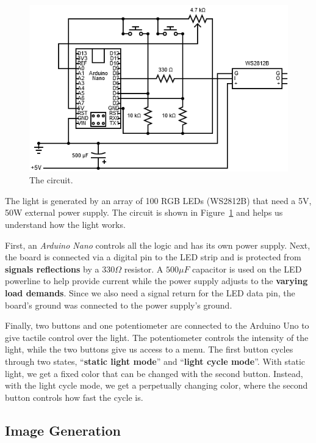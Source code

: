 \documentclass[preprint]{elsarticle}
\begin{document}
\begin{figure}[H]
	\centering
	\includegraphics[scale=0.5, keepaspectratio]{img/project_img/circuit-light.png}
	\caption{The circuit.}
	\label{fig:light-circuit}
\end{figure}

The light is generated by an array of 100 RGB LEDs (WS2812B) that need a 5V, 50W external power supply. 
The circuit is shown in Figure~\ref{fig:light-circuit} and helps us understand how the light works. 

First, an \emph{Arduino Nano} controls all the logic and has its own power supply. 
Next, the board is connected via a digital pin to the LED strip and is protected 
from \textbf{signals reflections} by a $330\Omega$ resistor. 
A $500 \mu F$ capacitor is used on the LED powerline to help provide current 
while the power supply adjusts to the \textbf{varying load demands}. 
Since we also need a signal return for the LED data pin, the board's ground was 
connected to the power supply's ground. 

Finally, two buttons and one potentiometer are connected to the Arduino Uno to give tactile 
control over the light. 
The potentiometer controls the intensity of the light, 
while the two buttons give us access to a menu. 
The first button cycles through two states, ``\textbf{static light mode}'' and ``\textbf{light cycle mode}''. 
With static light, we get a fixed color that can be changed with the second button. Instead, 
with the light cycle mode, we get a perpetually changing color, 
where the second button controls how fast the cycle is.



\subsection{Image Generation}
\end{document}
